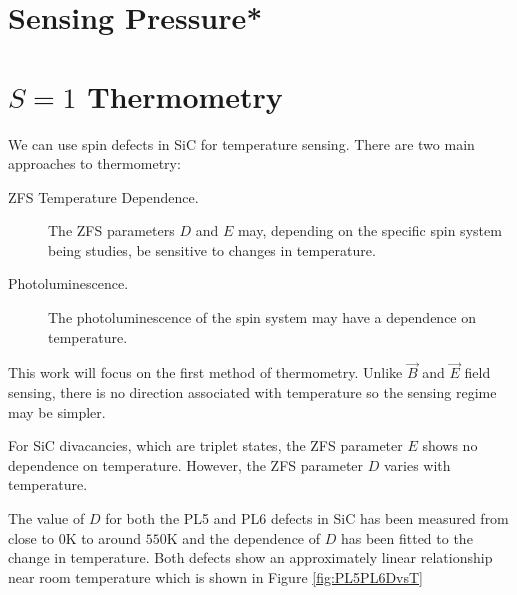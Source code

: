 \cite{Isoya2008}



\section{Sensing Pressure*}
\cite{doi:10.1021/acs.nanolett.2c03378}
\cite{PhysRevLett.112.087601}
\cite{PhysRevLett.112.187601}

\section{$S=1$ Thermometry}
\cite{Chen2011}
\cite{ajev2009}
\cite{PhysRevApplied.8.044015}
\cite{D3NR00430A}
\cite{PhysRevApplied.10.044042}
\cite{PhysRevB.104.125305}
\cite{PhysRevB.91.155404}

\cite{Quan:23}



We can use spin defects in SiC for temperature sensing. 
There are two main approaches to thermometry:
\begin{description}
    \item[ZFS Temperature Dependence.] The ZFS parameters $D$ and $E$ may, depending on the specific spin system being studies, be sensitive to changes in temperature. 
    \item[Photoluminescence.] The photoluminescence of the spin system may have a dependence on temperature. 
\end{description}

This work will focus on the first method of thermometry. Unlike $\vec{B}$ and $\vec{E}$ field sensing, there is no direction associated with temperature so the sensing regime may be simpler.  

For SiC divacancies, which are triplet states, the ZFS parameter $E$ shows no dependence on temperature. However, the ZFS parameter $D$ varies with temperature. 

The value of $D$ for both the PL5 and PL6 defects in SiC has been measured from close to $0$K to around $550$K and the dependence of $D$ has been fitted to the change in temperature. 
Both defects show an approximately linear relationship near room temperature which is shown in Figure \ref{fig:PL5PL6DvsT}

